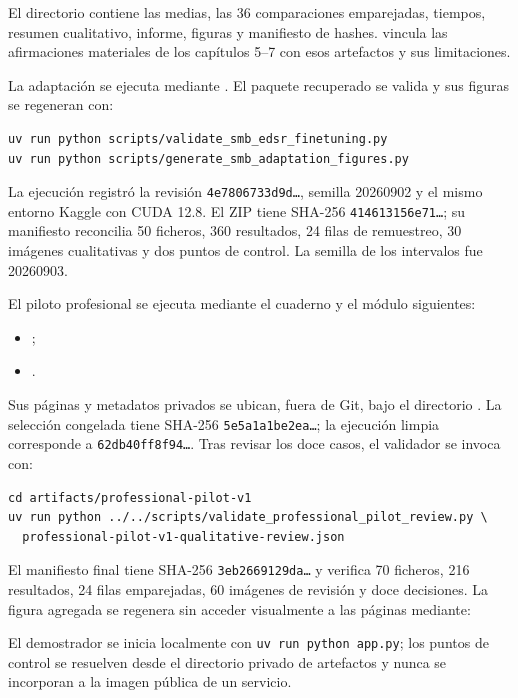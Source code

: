 El directorio  contiene las medias, las 36
comparaciones emparejadas, tiempos, resumen cualitativo, informe, figuras y manifiesto de hashes.
 vincula las afirmaciones materiales de los capítulos
5--7 con esos artefactos y sus limitaciones.

La adaptación se ejecuta mediante
. El paquete recuperado se valida y sus figuras se
regeneran con:

\begin{verbatim}
uv run python scripts/validate_smb_edsr_finetuning.py
uv run python scripts/generate_smb_adaptation_figures.py
\end{verbatim}

La ejecución registró la revisión \texttt{4e7806733d9d\ldots}, semilla 20260902 y el mismo entorno
Kaggle con CUDA 12.8. El ZIP tiene SHA-256 \texttt{414613156e71\ldots}; su manifiesto reconcilia
50 ficheros, 360 resultados, 24 filas de remuestreo, 30 imágenes cualitativas y dos puntos de
control. La semilla de los intervalos fue 20260903.

El piloto profesional se ejecuta mediante el cuaderno y el módulo siguientes:
\begin{itemize}
  \item \small{};
  \item \small{}.
\end{itemize}
Sus páginas y metadatos privados se ubican, fuera de Git, bajo el directorio
. La selección congelada tiene SHA-256
\texttt{5e5a1a1be2ea\ldots}; la ejecución limpia corresponde a
\texttt{62db40ff8f94\ldots}. Tras revisar los doce casos, el validador se invoca con:

\begin{verbatim}
cd artifacts/professional-pilot-v1
uv run python ../../scripts/validate_professional_pilot_review.py \
  professional-pilot-v1-qualitative-review.json
\end{verbatim}

El manifiesto final tiene SHA-256 \texttt{3eb2669129da\ldots} y verifica 70 ficheros, 216
resultados, 24 filas emparejadas, 60 imágenes de revisión y doce decisiones. La figura agregada se
regenera sin acceder visualmente a las páginas mediante:
\begin{quote}
  \small{}
\end{quote}
El demostrador se inicia localmente con
\texttt{uv run python app.py}; los puntos de control se resuelven desde el directorio privado de
artefactos y nunca se incorporan a la imagen pública de un servicio.

